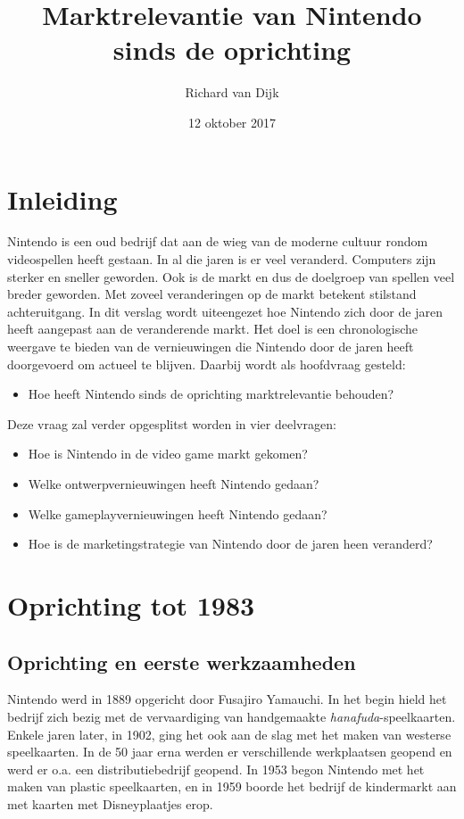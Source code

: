 \documentclass{article}
\title{Marktrelevantie van Nintendo sinds de oprichting}
\date{12 oktober 2017}
\author{Richard van Dijk}
\begin{document}
\maketitle
\newpage
\tableofcontents
\newpage
{}
\setcounter{page}{1}
\section{Inleiding}
Nintendo is een oud bedrijf dat aan de wieg van de moderne cultuur rondom videospellen heeft gestaan. In al die jaren is er veel veranderd. Computers zijn sterker en sneller geworden. Ook is de markt en dus de doelgroep van spellen veel breder geworden. Met zoveel veranderingen op de markt betekent stilstand achteruitgang. In dit verslag wordt uiteengezet hoe Nintendo zich door de jaren heeft aangepast aan de veranderende markt. Het doel is een chronologische weergave te bieden van de vernieuwingen die Nintendo door de jaren heeft doorgevoerd om actueel te blijven. Daarbij wordt als hoofdvraag gesteld:
\begin{itemize} \item Hoe heeft Nintendo sinds de oprichting marktrelevantie behouden? \end{itemize}
Deze vraag zal verder opgesplitst worden in vier deelvragen:
\begin{itemize}
\item Hoe is Nintendo in de video game markt gekomen?
\item Welke ontwerpvernieuwingen heeft Nintendo gedaan?
\item Welke gameplayvernieuwingen heeft Nintendo gedaan?
\item Hoe is de marketingstrategie van Nintendo door de jaren heen veranderd?
\end{itemize}
\section{Oprichting tot 1983}
\subsection{Oprichting en eerste werkzaamheden}
Nintendo werd in 1889 opgericht door Fusajiro Yamauchi. In het begin hield het bedrijf zich bezig met de vervaardiging van handgemaakte \textit{hanafuda}-speelkaarten. Enkele jaren later, in 1902, ging het ook aan de slag met het maken van westerse speelkaarten. In de 50 jaar erna werden er verschillende werkplaatsen geopend en werd er o.a. een distributiebedrijf geopend. In 1953 begon Nintendo met het maken van plastic speelkaarten, en in 1959 boorde het bedrijf de kindermarkt aan met kaarten met Disneyplaatjes erop. 
\end{document}
